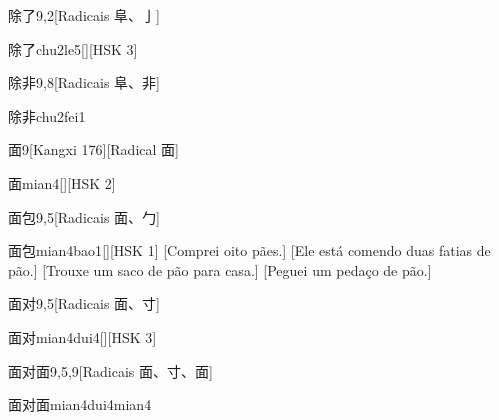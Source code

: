 \begin{entry}{除了}{9,2}[Radicais ⾩、⼅]
  \begin{phonetics}{除了}{chu2le5}[][HSK 3]
  \end{phonetics}
\end{entry}

\begin{entry}{除非}{9,8}[Radicais ⾩、⾮]
  \begin{phonetics}{除非}{chu2fei1}
  \end{phonetics}
\end{entry}

\begin{entry}{面}{9}[Kangxi 176][Radical ⾯]
  \begin{phonetics}{面}{mian4}[][HSK 2]
  \end{phonetics}
\end{entry}

\begin{entry}{面包}{9,5}[Radicais ⾯、⼓]
  \begin{phonetics}{面包}{mian4bao1}[][HSK 1]
    [Comprei oito pães.]
    [Ele está comendo duas fatias de pão.]
    [Trouxe um saco de pão para casa.]
    [Peguei um pedaço de pão.]
  \end{phonetics}
\end{entry}

\begin{entry}{面对}{9,5}[Radicais ⾯、⼨]
  \begin{phonetics}{面对}{mian4dui4}[][HSK 3]
  \end{phonetics}
\end{entry}

\begin{entry}{面对面}{9,5,9}[Radicais ⾯、⼨、⾯]
  \begin{phonetics}{面对面}{mian4dui4mian4}
  \end{phonetics}
\end{entry}

